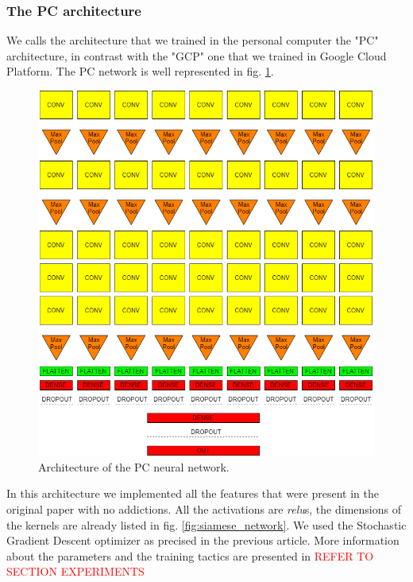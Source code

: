 \subsubsection{The PC architecture}
We calls the architecture that we trained in the personal computer the "PC" architecture, in contrast with the "GCP" one that we trained in Google Cloud Platform.\newline
The PC network is well represented in fig. \ref{fig:PC_net}.
\begin{figure}[!ht]
    \centering
    \includegraphics[scale=0.34]{images/PC_net.png}
    \caption{Architecture of the PC neural network.}
    \label{fig:PC_net}
\end{figure}
In this architecture we implemented all the features that were present in the original paper \cite{Noroozi_2016} with no addictions. All the activations are \emph{relu}s, the dimensions of the kernels are already listed in fig. \ref{fig:siamese_network}. We used the Stochastic Gradient Descent optimizer as precised in the previous article. More information about the parameters and the training tactics are presented in \textcolor{red}{REFER TO SECTION EXPERIMENTS}

